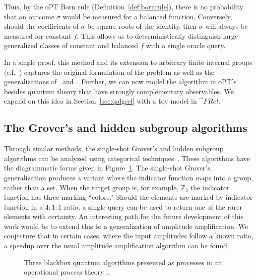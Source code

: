 Thus, by the oPT Born rule (Definition~\ref{def:bornrule}), there is no probability that an outcome $\sigma$ would be measured for a balanced function.  Conversely, should the coefficients of $\sigma$ be square roots of the identity, then $\sigma$ will always be measured for constant $f$.  This allows us to deterministically distinguish large generalized classes of constant and balanced $f$ with a single oracle query.  

In a single proof, this method and its extension to arbitrary finite internal groups (c.f.~\cite{vicary-tqa}) captures the original formulation of the problem as well as the generalizations of~\cite{hoyer1999conjugated} and~\cite{batty2006extending}. Further, we can now model the algorithm in oPT's besides quantum theory that have strongly complementary observables. We expand on this idea in Section~\ref{sec:qalgrel} with a toy model in $\cat{FRel}$. 

\subsection{The Grover's and hidden subgroup algorithms}
Through similar methods, the single-shot Grover's and hidden subgroup algorithms can be analyzed using categorical techniques~\cite{vicary-tqa}. These algorithms have the diagrammatic forms given in Figure~\ref{fig:algtriplet}. The single-shot Grover's generalization produces a variant where the indicator function maps into a group, rather than a set. When the target group is, for example, $\mathbb{Z}_3$ the indicator function has three marking ``colors." Should the elements are marked by indicator function in a $4:1:1$ ratio, a single query can be used to return one of the rarer elements with certainty. An interesting path for the future development of this work would be to extend this to a generalization of amplitude amplification. We conjecture that in certain cases, where the input amplitudes follow a known ratio, a speedup over the usual amplitude amplification algorithm can be found.

\begin{figure}[t]

\caption{Three blackbox quantum algorithms presented as processes in an operational process theory~\cite{vicary-tqa}.}
\label{fig:algtriplet}
\end{figure}


